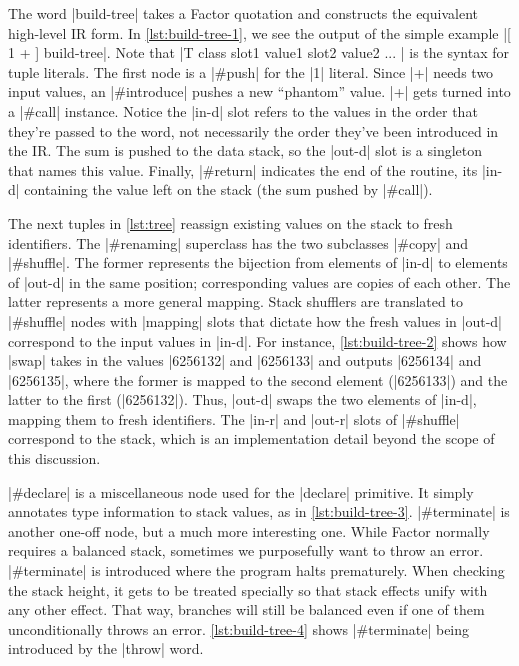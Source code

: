 
The word \factor|build-tree| takes a Factor quotation and constructs the
equivalent high-level \gls{IR} form.  In \vref{lst:build-tree-1}, we see the
output of the simple example
%
\factor|[ 1 + ] build-tree|.
%
Note that
%
\factor|T{ class { slot1 value1 } { slot2 value2 } ... }|
%
is the syntax for tuple literals.  The first node is a \factor|#push| for the
\factor|1| literal.  Since \factor|+| needs two input values, an
\factor|#introduce| pushes a new ``phantom'' value.  \factor|+| gets turned
into a \factor|#call| instance.  Notice the \factor|in-d| slot refers to the
values in the order that they're passed to the word, not necessarily the order
they've been introduced in the \gls{IR}.  The sum is pushed to the data stack,
so the \factor|out-d| slot is a singleton that names this value.  Finally,
\factor|#return| indicates the end of the routine, its \factor|in-d| containing
the value left on the stack (the sum pushed by \factor|#call|).


The next tuples in \vref{lst:tree} reassign existing values on the stack to
fresh identifiers.  The \factor|#renaming| superclass has the two subclasses
\factor|#copy| and \factor|#shuffle|.  The former represents the bijection from
elements of \factor|in-d| to elements of \factor|out-d| in the same position;
corresponding values are copies of each other.  The latter represents a more
general mapping.  Stack shufflers are translated to \factor|#shuffle| nodes
with \factor|mapping| slots that dictate how the fresh values in \factor|out-d|
correspond to the input values in \factor|in-d|.  For instance,
\vref{lst:build-tree-2} shows how \factor|swap| takes in the values
\factor|6256132| and \factor|6256133| and outputs \factor|6256134| and
\factor|6256135|, where the former is mapped to the second element
(\factor|6256133|) and the latter to the first (\factor|6256132|).  Thus,
\factor|out-d| swaps the two elements of \factor|in-d|, mapping them to fresh
identifiers.  The \factor|in-r| and \factor|out-r| slots of \factor|#shuffle|
correspond to the  stack, which is an implementation detail beyond
the scope of this discussion.


\factor|#declare| is a miscellaneous node used for the \factor|declare|
primitive.  It simply annotates type information to stack values, as in
\vref{lst:build-tree-3}.  \factor|#terminate| is another one-off node, but a
much more interesting one.  While Factor normally requires a balanced stack,
sometimes we purposefully want to throw an error.  \factor|#terminate| is
introduced where the program halts prematurely.  When checking the stack
height, it gets to be treated specially so that  stack effects
unify with any other effect.  That way, branches will still be balanced even if
one of them unconditionally throws an error.  \vref{lst:build-tree-4} shows
\factor|#terminate| being introduced by the \factor|throw| word.

